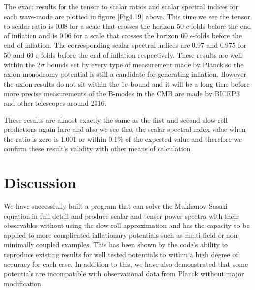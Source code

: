 \documentclass[a4paper,12pt,twoside]{report}
\begin{document}
The exact results for the tensor to scalar ratios and scalar spectral indices for each wave-mode are plotted in figure \ref{Fig4.19} above. This time we see the tensor to scalar ratio is 0.08 for a scale that crosses the horizon 50 e-folds before the end of inflation and is 0.06 for a scale that crosses the horizon 60 e-folds before the end of inflation. The corresponding scalar spectral indices are 0.97 and 0.975 for 50 and 60 e-folds before the end of inflation respectively. These results are well within the 2$\sigma$ bounds set by every type of measurement made by Planck so the axion monodromy potential is still a candidate for generating inflation. However the axion results do not sit within the 1$\sigma$ bound and it will be a long time before more precise measurements of the B-modes in the CMB are made by BICEP3 and other telescopes around 2016.

These results are almost exactly the same as the first and second slow roll predictions again here and also we see that the scalar spectral index value when the ratio is zero is 1.001 or within 0.1\% of the expected value and therefore we confirm these result's validity with other means of calculation.



\chapter{Discussion}
\label{chap:Discuss}

We have successfully built a program that can solve the Mukhanov-Sasaki equation in full detail and produce scalar and tensor power spectra with their observables without using the slow-roll approximation and has the capacity to be applied to more complicated inflationary potentials such as multi-field or non-minimally coupled examples. This has been shown by the code's ability to reproduce existing results for well tested potentials to within a high degree of accuracy for each case. In addition to this, we have also demonstrated that some potentials are incompatible with observational data from Planck without major modification.
\end{document}
